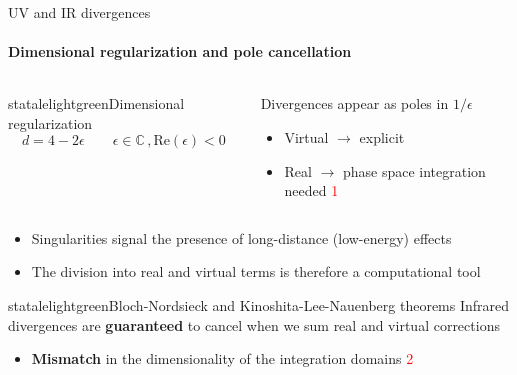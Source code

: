 \begin{frame} {UV and IR divergences}
  \framesubtitle{Dimensional regularization and pole cancellation}

  \begin{columns}

    \begin{column}{0.4\textwidth}
    \begin{colorblock}[black]{statalelightgreen}{Dimensional regularization}
        \begin{equation*}
            d=4-2\epsilon \qquad \epsilon \in \mathbb{C} \, , \mathrm{Re}(\epsilon)<0
        \end{equation*}
      \end{colorblock}
    \end{column}

    \begin{column}{0.6\textwidth}
    Divergences appear as poles in $1/\epsilon$ \\
    \begin{itemize}
        \item Virtual $\to$ explicit
        \item Real $\to$ phase space integration needed \textcolor{red}{\textcircled{1}}
    \end{itemize}
    \end{column}
    \end{columns}

    \vspace{1.5em}

    \begin{itemize}
        \item Singularities signal the presence of long-distance (low-energy) effects
        \item The division into real and virtual terms is therefore a computational tool
    \end{itemize}

    \vspace{1.em}

    \begin{colorblock}[black]{statalelightgreen}{Bloch-Nordsieck and Kinoshita-Lee-Nauenberg theorems}
            Infrared divergences are \textbf{guaranteed} to cancel when we sum real and virtual corrections
      \end{colorblock}

      \begin{itemize}
        \item \textbf{Mismatch} in the dimensionality of the integration domains \textcolor{red}{\textcircled{2}}
    \end{itemize}
\end{frame}

